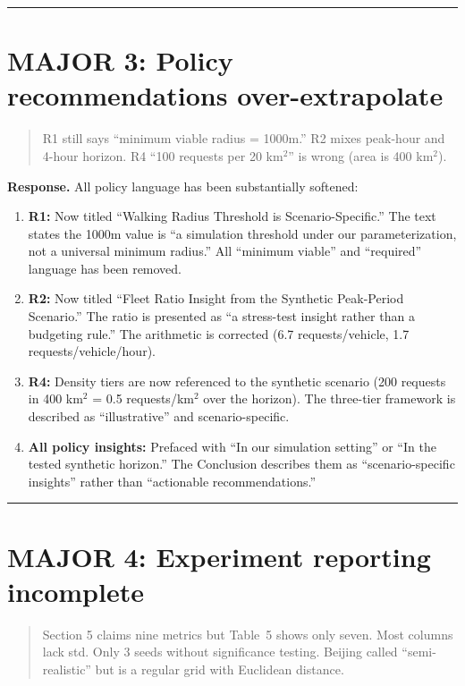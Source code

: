 \documentclass[12pt]{article}
\newenvironment{revcomment}{%
  \begin{quote}\itshape
}{%
  \end{quote}
}
\begin{document}
\bigskip\hrule\bigskip

\section*{MAJOR 3: Policy recommendations over-extrapolate}

\begin{revcomment}
R1 still says ``minimum viable radius = 1000m.'' R2 mixes peak-hour and 4-hour horizon. R4 ``100 requests per 20 km$^2$'' is wrong (area is 400 km$^2$).
\end{revcomment}

\textbf{Response.} All policy language has been substantially softened:

\begin{enumerate}
  \item \textbf{R1:} Now titled ``Walking Radius Threshold is Scenario-Specific.'' The text states the 1000m value is ``a simulation threshold under our parameterization, not a universal minimum radius.'' All ``minimum viable'' and ``required'' language has been removed.

  \item \textbf{R2:} Now titled ``Fleet Ratio Insight from the Synthetic Peak-Period Scenario.'' The ratio is presented as ``a stress-test insight rather than a budgeting rule.'' The arithmetic is corrected (6.7 requests/vehicle, 1.7 requests/vehicle/hour).

  \item \textbf{R4:} Density tiers are now referenced to the synthetic scenario (200 requests in 400 km$^2$ = 0.5 requests/km$^2$ over the horizon). The three-tier framework is described as ``illustrative'' and scenario-specific.

  \item \textbf{All policy insights:} Prefaced with ``In our simulation setting'' or ``In the tested synthetic horizon.'' The Conclusion describes them as ``scenario-specific insights'' rather than ``actionable recommendations.''
\end{enumerate}

\bigskip\hrule\bigskip

\section*{MAJOR 4: Experiment reporting incomplete}

\begin{revcomment}
Section 5 claims nine metrics but Table~5 shows only seven. Most columns lack std. Only 3 seeds without significance testing. Beijing called ``semi-realistic'' but is a regular grid with Euclidean distance.
\end{revcomment}
\end{document}
